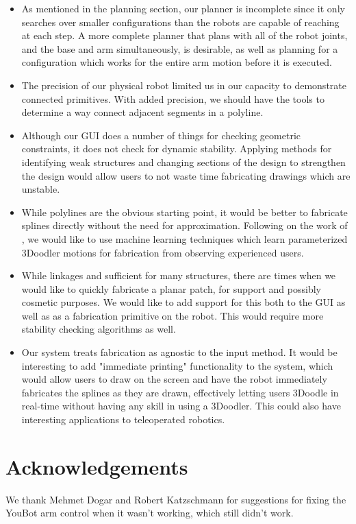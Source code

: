 \documentclass[conference]{acmsiggraph}
\begin{document}
\begin{itemize}
\item As mentioned in the planning section, our planner is incomplete since it only searches over smaller configurations than the robots are capable of reaching at each step.  A more complete planner that plans with all of the robot joints, and the base and arm simultaneously, is desirable, as well as planning for a configuration which works for the entire arm motion before it is executed.

\item The precision of our physical robot limited us in our capacity to demonstrate connected primitives.  With added precision, we should have the tools to determine a way connect adjacent segments in a polyline.

\item Although our GUI does a number of things for checking geometric constraints, it does not check for dynamic stability.  Applying methods for identifying weak structures and changing sections of the design to strengthen the design would allow users to not waste time fabricating drawings which are unstable.

\item While polylines are the obvious starting point, it would be better to fabricate splines directly without the need for approximation.  Following on the work of \cite{Caligraphy}, we would like to use machine learning techniques which learn parameterized 3Doodler motions for fabrication from observing experienced users.
 
\item While linkages and sufficient for many structures, there are times when we would like to quickly fabricate a planar patch, for support and possibly cosmetic purposes.  We would like to add support for this both to the GUI as well as as a fabrication primitive on the robot.  This would require more stability checking algorithms as well.

\item  Our system treats fabrication as agnostic to the input method.  It would be interesting to add "immediate printing" functionality to the system, which would allow users to draw on the screen and have the robot immediately fabricates the splines as they are drawn, effectively letting users 3Doodle in real-time without having any skill in using a 3Doodler.  This could also have interesting applications to teleoperated robotics.

\end{itemize}

\section*{Acknowledgements}

We thank Mehmet Dogar and Robert Katzschmann for suggestions for fixing the YouBot arm control when it wasn't working, which still didn't work.





\end{document}
